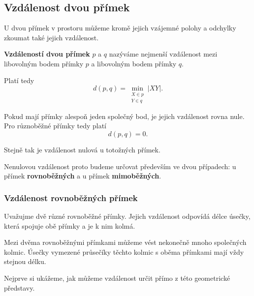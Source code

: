 \subsection{Vzdálenost dvou přímek}
\label{subsec:Distance_between_lines_space}

U dvou přímek v prostoru můžeme kromě jejich vzájemné polohy
a odchylky zkoumat také jejich vzdálenost.

\begin{definition}
    \label{def:Distance_between_lines_space}

    \textbf{Vzdáleností dvou přímek} $p$ a $q$ nazýváme nejmenší
    vzdálenost mezi libovolným bodem přímky $p$ a libovolným bodem
    přímky $q$.

    Platí tedy
    \[
        d(p,q)
        =
        \min_{\substack{X\in p\\Y\in q}} |XY|.
    \]
\end{definition}

Pokud mají přímky alespoň jeden společný bod, je jejich vzdálenost
rovna nule. Pro různoběžné přímky tedy platí
\[
    d(p,q)=0.
\]

Stejně tak je vzdálenost nulová u totožných přímek.

Nenulovou vzdálenost proto budeme určovat především ve dvou případech:
u přímek \textbf{rovnoběžných} a u přímek \textbf{mimoběžných}.



\subsubsection{Vzdálenost rovnoběžných přímek}
\label{subsubsec:Distance_parallel_lines_space}

Uvažujme dvě různé rovnoběžné přímky. Jejich vzdálenost odpovídá
délce úsečky, která spojuje obě přímky a je k nim kolmá.

Mezi dvěma rovnoběžnými přímkami můžeme vést nekonečně mnoho
společných kolmic. Úsečky vymezené průsečíky těchto kolmic
s oběma přímkami mají vždy stejnou délku.

Nejprve si ukážeme, jak můžeme vzdálenost určit přímo z této
geometrické představy.

